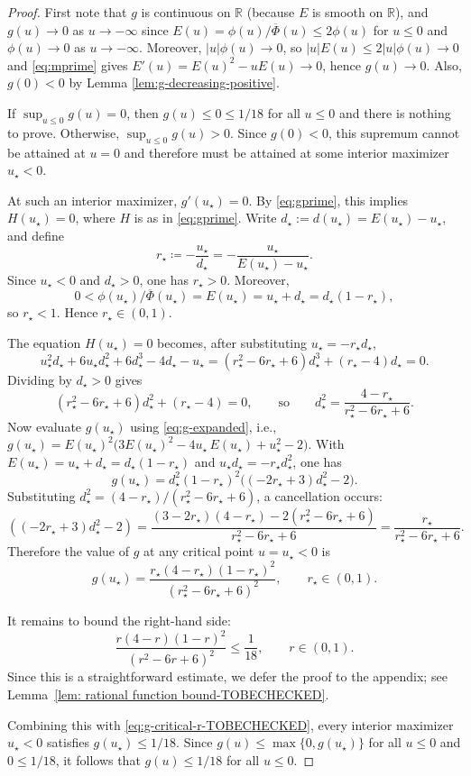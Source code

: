 \documentclass[11pt]{article}
\begin{document}
\begin{proof}
First note that $g$ is continuous on $\mathbb{R}$ (because $E$ is smooth on $\mathbb{R}$),
and $g(u)\to 0$ as $u\to -\infty$ since $E(u)=\phi(u)/\overline{\Phi}(u)\le 2\phi(u)$ for $u\le 0$
and $\phi(u)\to 0$ as $u\to-\infty$. Moreover, $|u|\phi(u)\to 0$, so $|u|E(u)\le 2|u|\phi(u)\to 0$ and
\eqref{eq:mprime} gives $E'(u)=E(u)^2-uE(u)\to 0$, hence $g(u)\to 0$.
Also, $g(0)<0$ by Lemma \ref{lem:g-decreasing-positive}.

If $\sup_{u\le 0}g(u)=0$, then $g(u)\le 0\le 1/18$ for all $u\le 0$ and there is nothing to prove.
Otherwise, $\sup_{u\le 0}g(u)>0$. Since $g(0)<0$, this supremum cannot be attained at $u=0$ and therefore
must be attained at some interior maximizer $u_\star<0$.

At such an interior maximizer, $g'(u_\star)=0$. By \eqref{eq:gprime}, this implies $H(u_\star)=0$,
where $H$ is as in \eqref{eq:gprime}. Write  $d_\star:=d(u_\star)=E(u_\star)-u_\star$, and define
\[
r_\star\coloneqq -\frac{u_\star}{d_\star}=-\frac{u_\star}{E(u_\star)-u_\star}.
\]
Since $u_\star<0$ and $d_\star>0$, one has $r_\star>0$. Moreover, 
$$0<\phi(u_\star)/\overline{\Phi}(u_\star)=E(u_\star)=u_\star+d_\star=d_\star(1-r_\star),$$ so $r_\star<1$.
Hence $r_\star\in(0,1)$.

The equation $H(u_\star)=0$ becomes, after substituting $u_\star=-r_\star d_\star$,
\[
u_\star^2 d_\star + 6u_\star d_\star^2 + 6 d_\star^3 -4d_\star -u_\star
= (r_\star^2-6r_\star+6)d_\star^3 + (r_\star-4)d_\star = 0.
\]
Dividing by $d_\star>0$ gives
\[
(r_\star^2-6r_\star+6)d_\star^2 + (r_\star-4)=0,
\qquad\text{so}\qquad
d_\star^2=\frac{4-r_\star}{r_\star^2-6r_\star+6}.
\]
Now evaluate $g(u_\star)$ using \eqref{eq:g-expanded}, i.e., $g(u_\star)=E(u_\star)^2\bigl(3E(u_\star)^2-4u_\star\,E(u_\star)+u_\star^2-2\bigr)
$. With $E(u_\star)=u_\star+d_\star=d_\star(1-r_\star)$ and
$u_\star d_\star=-r_\star d_\star^2$, one has
\[
g(u_\star)=d_\star^2(1-r_\star)^2\bigl((-2r_\star+3)d_\star^2-2\bigr).
\]
Substituting $d_\star^2=(4-r_\star)/(r_\star^2-6r_\star+6)$, a cancellation occurs:
\[
((-2r_\star+3)d_\star^2-2)
=\frac{(3-2r_\star)(4-r_\star)-2(r_\star^2-6r_\star+6)}{r_\star^2-6r_\star+6}
=\frac{r_\star}{r_\star^2-6r_\star+6}.
\]
Therefore the value of $g$ at any critical point $u=u_\star<0$ is
\begin{equation}\label{eq:g-critical-r-TOBECHECKED}
g(u_\star)=\frac{r_\star(4-r_\star)(1-r_\star)^2}{(r_\star^2-6r_\star+6)^2},
\qquad r_\star\in(0,1).
\end{equation}

It remains to bound the right-hand side:
\[
\frac{r(4-r)(1-r)^2}{(r^2-6r+6)^2}\le \frac{1}{18},
\qquad r\in(0,1).
\]
Since this is a straightforward estimate, we defer the proof to the appendix; see Lemma~\ref{lem: rational function bound-TOBECHECKED}. 


Combining this with \eqref{eq:g-critical-r-TOBECHECKED},  every interior maximizer $u_\star<0$
satisfies $g(u_\star)\le 1/18$. Since $g(u)\le \max\{0,g(u_\star)\}$ for all $u\le 0$ and $0\le 1/18$,
it follows that $g(u)\le 1/18$ for all $u\le 0$.
\end{proof}
\end{document}
